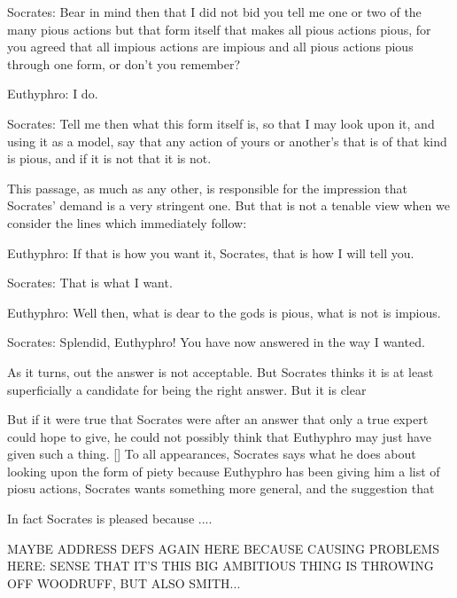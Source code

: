 \documentclass[11pt,letterpaper,oneside]{amsart} %
\begin{document}
\begin{squote}Socrates: Bear in mind then that I did not bid you tell me one or two of the many pious actions but that form itself that makes all pious actions pious, for you agreed that all impious actions are impious and all pious actions pious through one form, or don't you remember?

Euthyphro: I do.

Socrates: Tell me then what this form itself is, so that I may look upon it, and using it as a model, say that any action of yours or another's that is of that kind is pious, and if it is not that it is not.\end{squote}This passage, as much as any other, is responsible for the impression that Socrates' demand is a very stringent one. But that is not a tenable view when we consider the lines which immediately follow:\begin{squote}Euthyphro: If that is how you want it, Socrates, that is how I will tell you.

Socrates: That is what I want.

Euthyphro: Well then, what is dear to the gods is pious, what is not is impious.

Socrates: Splendid, Euthyphro! You have now answered in the way I wanted.\end{squote}As it turns, out the answer is not acceptable. But Socrates thinks it is at least superficially a candidate for being the right answer. But it is clear 




But if it were true that Socrates were after an answer that only a true expert could hope to give, he could not possibly think that Euthyphro may just have given such a thing. [] To all appearances, Socrates says what he does about looking upon the form of piety because Euthyphro has been giving him a list of piosu actions, Socrates wants something more general, and the suggestion that 



In fact Socrates is pleased because ....



MAYBE ADDRESS DEFS AGAIN HERE BECAUSE CAUSING PROBLEMS HERE: SENSE THAT IT'S THIS BIG AMBITIOUS THING IS THROWING OFF WOODRUFF, BUT ALSO SMITH...
\end{document}
